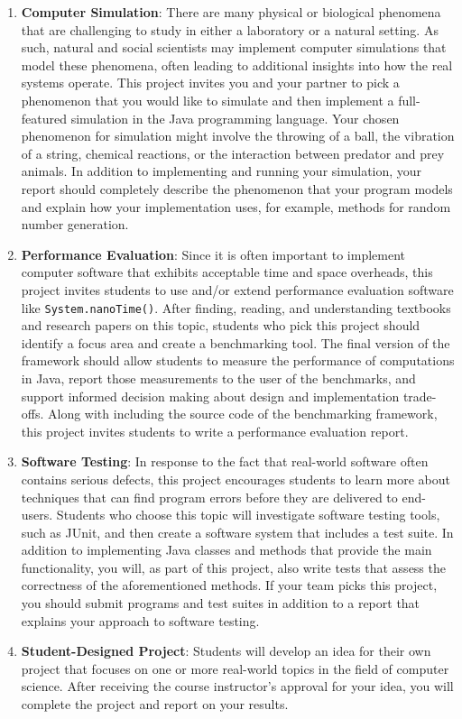 \documentclass[11pt]{article}
\newcommand{\program}[1]{\lstinline{#1}}
\begin{document}
\begin{enumerate}
  \item {\bf Computer Simulation}: There are many physical or biological phenomena that are challenging to study in
    either a laboratory or a natural setting. As such, natural and social scientists may implement computer simulations
    that model these phenomena, often leading to additional insights into how the real systems operate. This project
    invites you and your partner to pick a phenomenon that you would like to simulate and then implement a full-featured
    simulation in the Java programming language. Your chosen phenomenon for simulation might involve the throwing of a
    ball, the vibration of a string, chemical reactions, or the interaction between predator and prey animals. In
    addition to implementing and running your simulation, your report should completely describe the phenomenon that
    your program models and explain how your implementation uses, for example, methods for random number generation.

  \item {\bf Performance Evaluation}: Since it is often important to implement computer software that exhibits
    acceptable time and space overheads, this project invites students to use and/or extend performance evaluation
    software like \program{System.nanoTime()}. After finding, reading, and understanding textbooks and research papers
    on this topic, students who pick this project should identify a focus area and create a benchmarking tool. The final
    version of the framework should allow students to measure the performance of computations in Java, report those
    measurements to the user of the benchmarks, and support informed decision making about design and implementation
    trade-offs. Along with including the source code of the benchmarking framework, this project invites students to
    write a performance evaluation report.

  \item {\bf Software Testing}: In response to the fact that real-world software often contains serious defects, this
    project encourages students to learn more about techniques that can find program errors before they are delivered to
    end-users. Students who choose this topic will investigate software testing tools, such as JUnit, and then create
    a software system that includes a test suite. In addition to implementing Java classes and methods that provide the
    main functionality, you will, as part of this project, also write tests that assess the correctness of the
    aforementioned methods. If your team picks this project, you should submit programs and test suites in
    addition to a report that explains your approach to software testing.

  \item {\bf Student-Designed Project}: Students will develop an idea for their own project that focuses on one or more
    real-world topics in the field of computer science. After receiving the course instructor's approval for your idea,
    you will complete the project and report on your results.

\end{enumerate}
\end{document}
